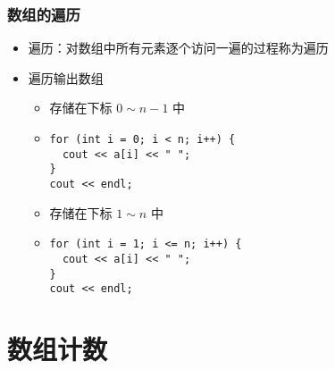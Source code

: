 \begin{frame}[fragile]
    \frametitle{数组的遍历}

    \begin{overlayarea}{\textwidth}{.66\textheight}
        \begin{itemize}
            \item 遍历：对数组中所有元素逐个访问一遍的过程称为遍历

            \item 遍历输出数组

                \begin{itemize}
                    \item<1-> 存储在下标 $0 \sim n - 1$ 中
                    \item<1-> \lstinline|for (int i = 0; i < n; i++) {|\\
                        \lstinline|  cout << a[i] << " ";|\\
                        \lstinline|}|\\
                        \lstinline|cout << endl;|\\
                    \item<2-> 存储在下标 $1 \sim n$ 中
                    \item<2-> \lstinline|for (int i = 1; i <= n; i++) {|\\
                        \lstinline|  cout << a[i] << " ";|\\
                        \lstinline|}|\\
                        \lstinline|cout << endl;|\\
                \end{itemize}

        \end{itemize}
    \end{overlayarea}
\end{frame}


\section{数组计数}

